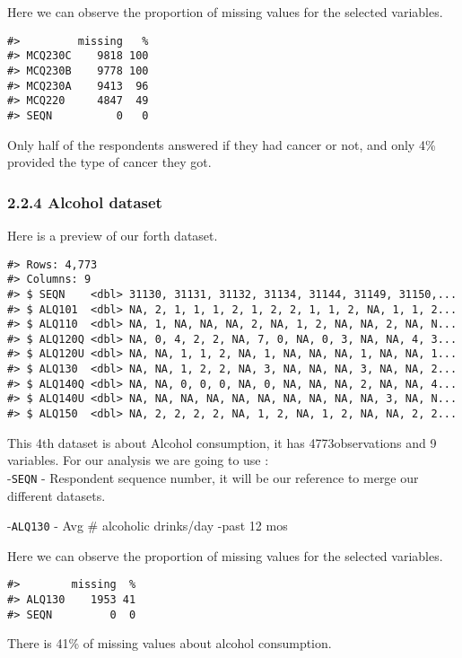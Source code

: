 \documentclass[
]{article}
\begin{document}
Here we can observe the proportion of missing values for the selected
variables.

\begin{verbatim}
#>         missing   %
#> MCQ230C    9818 100
#> MCQ230B    9778 100
#> MCQ230A    9413  96
#> MCQ220     4847  49
#> SEQN          0   0
\end{verbatim}

Only half of the respondents answered if they had cancer or not, and
only 4\% provided the type of cancer they got.

\hypertarget{alcohol-dataset}{%
\subsubsection{2.2.4 Alcohol dataset}\label{alcohol-dataset}}

Here is a preview of our forth dataset.

\begin{verbatim}
#> Rows: 4,773
#> Columns: 9
#> $ SEQN    <dbl> 31130, 31131, 31132, 31134, 31144, 31149, 31150,...
#> $ ALQ101  <dbl> NA, 2, 1, 1, 1, 2, 1, 2, 2, 1, 1, 2, NA, 1, 1, 2...
#> $ ALQ110  <dbl> NA, 1, NA, NA, NA, 2, NA, 1, 2, NA, NA, 2, NA, N...
#> $ ALQ120Q <dbl> NA, 0, 4, 2, 2, NA, 7, 0, NA, 0, 3, NA, NA, 4, 3...
#> $ ALQ120U <dbl> NA, NA, 1, 1, 2, NA, 1, NA, NA, NA, 1, NA, NA, 1...
#> $ ALQ130  <dbl> NA, NA, 1, 2, 2, NA, 3, NA, NA, NA, 3, NA, NA, 2...
#> $ ALQ140Q <dbl> NA, NA, 0, 0, 0, NA, 0, NA, NA, NA, 2, NA, NA, 4...
#> $ ALQ140U <dbl> NA, NA, NA, NA, NA, NA, NA, NA, NA, NA, 3, NA, N...
#> $ ALQ150  <dbl> NA, 2, 2, 2, 2, NA, 1, 2, NA, 1, 2, NA, NA, 2, 2...
\end{verbatim}

This 4th dataset is about Alcohol consumption, it has 4773observations
and 9 variables. For our analysis we are going to use :\\
-\texttt{SEQN} - Respondent sequence number, it will be our reference to
merge our different datasets.

-\texttt{ALQ130} - Avg \# alcoholic drinks/day -past 12 mos

Here we can observe the proportion of missing values for the selected
variables.

\begin{verbatim}
#>        missing  %
#> ALQ130    1953 41
#> SEQN         0  0
\end{verbatim}

There is 41\% of missing values about alcohol consumption.
\end{document}
